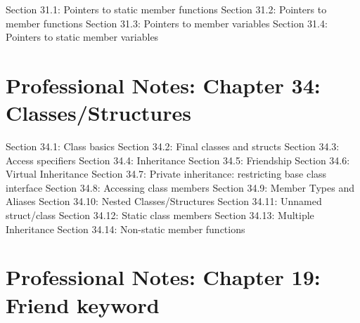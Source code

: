Section 31.1: Pointers to static member functions Section 31.2: Pointers
to member functions Section 31.3: Pointers to member variables Section
31.4: Pointers to static member variables

\hypertarget{professional-notes-chapter-34-classesstructures}{%
\chapter{Professional Notes: Chapter 34:
Classes/Structures}\label{professional-notes-chapter-34-classesstructures}}

Section 34.1: Class basics Section 34.2: Final classes and structs
Section 34.3: Access speciﬁers Section 34.4: Inheritance Section 34.5:
Friendship Section 34.6: Virtual Inheritance Section 34.7: Private
inheritance: restricting base class interface Section 34.8: Accessing
class members Section 34.9: Member Types and Aliases Section 34.10:
Nested Classes/Structures Section 34.11: Unnamed struct/class Section
34.12: Static class members Section 34.13: Multiple Inheritance Section
34.14: Non-static member functions

\hypertarget{professional-notes-chapter-19-friend-keyword}{%
\chapter{Professional Notes: Chapter 19: Friend
keyword}\label{professional-notes-chapter-19-friend-keyword}}


